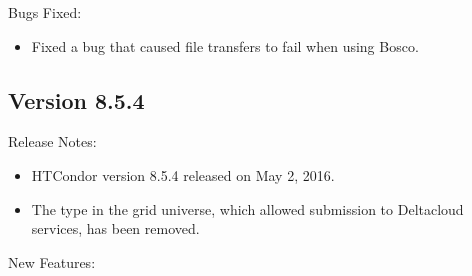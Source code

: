 \noindent Bugs Fixed:

\begin{itemize}

\item Fixed a bug that caused file transfers to fail when using Bosco.

\end{itemize}

\subsection*{\label{sec:New-8-5-4}Version 8.5.4}

\noindent Release Notes:

\begin{itemize}

\item HTCondor version 8.5.4 released on May 2, 2016.

\item The  type in the grid universe, which allowed
submission to Deltacloud services, has been removed.

\end{itemize}


\noindent New Features:

